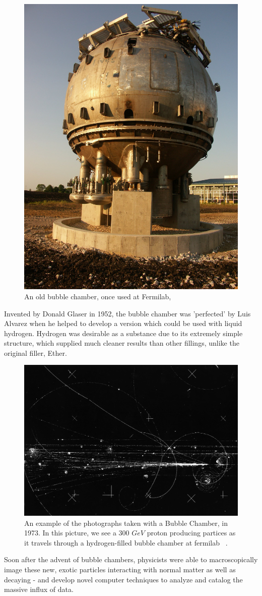 \begin{figure}[ht]
	\centering
	\includegraphics[width=0.5\linewidth]{figures/bubblechamberfnal.jpg}
	\caption{An old bubble chamber, once used at Fermilab,
	~\cite{FNALBubbleChamber2005}}
	\label{fig:bubble_chamber}
\end{figure}

Invented by Donald Glaser in 1952, the bubble chamber was 'perfected' by Luis
Alvarez when he helped to develop a version which could be used with liquid
hydrogen. Hydrogen was desirable as a substance due to its extremely simple
structure, which supplied much cleaner results than other fillings, unlike the
original filler, Ether.

\begin{figure}[ht]
	\centering
	\includegraphics[width=0.5\linewidth]{figures/bubble_chamber_tracks.jpg}
	\caption{
		An example of the photographs taken with a Bubble Chamber, in 1973.
		In this picture, we see a 300 $GeV$ proton producing partices as it travels
		through a hydrogen-filled bubble chamber at fermilab ~\cite{HD6B235}.
	}
	\label{fig:bubble_tracks}
\end{figure}

Soon after the advent of bubble chambers, physicists were able to
macroscopically image these new, exotic particles interacting with normal matter
as well as decaying - and develop novel computer techniques to analyze and
catalog the massive influx of data.

